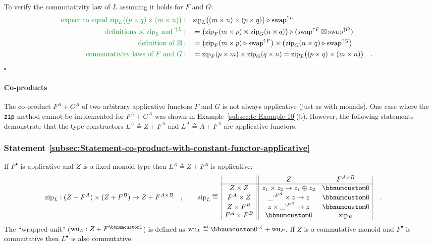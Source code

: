 To verify the commutativity law of $L$ assuming it holds for $F$
and $G$:
\begin{align*}
{\color{greenunder}\text{expect to equal }\text{zip}_{L}\big((p\times q)\times(m\times n)\big):}\quad & \text{zip}_{L}\big((m\times n)\times(p\times q)\big)\triangleright\text{swap}^{\uparrow L}\\
{\color{greenunder}\text{definitions of }\text{zip}_{L}\text{ and }^{\uparrow L}:}\quad & =\big(\text{zip}_{F}(m\times p)\times\text{zip}_{G}(n\times q)\big)\triangleright(\text{swap}^{\uparrow F}\boxtimes\text{swap}^{\uparrow G})\\
{\color{greenunder}\text{definition of }\boxtimes:}\quad & =\big(\text{zip}_{F}(m\times p)\triangleright\text{swap}^{\uparrow F}\big)\times\big(\text{zip}_{G}(n\times q)\triangleright\text{swap}^{\uparrow G}\big)\\
{\color{greenunder}\text{commutativity laws of }F\text{ and }G:}\quad & =\text{zip}_{F}(p\times m)\times\text{zip}_{G}(q\times n)=\text{zip}_{L}\big((p\times q)\times(m\times n)\big)\quad.
\end{align*}
$\square$

\paragraph{Co-products}

The co-product $F^{A}+G^{A}$ of two arbitrary applicative functors
$F$ and $G$ is not always applicative (just as with monads). One
case where the \lstinline!zip! method cannot be implemented for $F^{A}+G^{A}$
was shown in Example~\ref{subsec:tc-Example-10}(b). However, the
following statements demonstrate that the type constructors $L^{A}\triangleq Z+F^{A}$
and $L^{A}\triangleq A+F^{A}$ are applicative functors.

\subsubsection{Statement \label{subsec:Statement-co-product-with-constant-functor-applicative}\ref{subsec:Statement-co-product-with-constant-functor-applicative}}

If $F^{\bullet}$ is applicative and $Z$ is a fixed monoid type then
$L^{A}\triangleq Z+F^{A}$ is applicative:
\begin{align*}
 & \text{zip}_{L}:(Z+F^{A})\times(Z+F^{B})\rightarrow Z+F^{A\times B}\quad,\quad\quad\text{zip}_{L}\triangleq\,\begin{array}{|c||cc|}
 & Z & F^{A\times B}\\
\hline Z\times Z & z_{1}\times z_{2}\rightarrow z_{1}\oplus z_{2} & \bbnum 0\\
F^{A}\times Z & \_^{:F^{A}}\times z\rightarrow z & \bbnum 0\\
Z\times F^{B} & z\times\_^{:F^{B}}\rightarrow z & \bbnum 0\\
F^{A}\times F^{B} & \bbnum 0 & \text{zip}_{F}
\end{array}\quad.
\end{align*}
The \textsf{``}wrapped unit\textsf{''} ($\text{wu}_{L}:Z+F^{\bbnum 1}$) is defined
as $\text{wu}_{L}\triangleq\bbnum 0^{:Z}+\text{wu}_{F}$. If $Z$
is a commutative monoid and $F^{\bullet}$ is commutative then $L^{\bullet}$
is also commutative.

